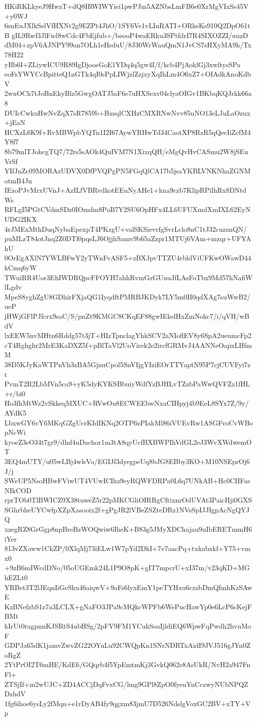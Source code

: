 HKiRKLkyeJ9HwzT+dQ8IRWIWYiei1pwPJm5AZNbsLmFB6e0XrMgVIxSs45V+y0WJ
6snEuJXlkSelVfHXNt2g9EZPt4JhO/1SY6Ve1vLIuRATI+ORkeKs910Q2DpO61tB
gIL9Rwf3JlFiel8wCdc4FbEjfub+/beooP4waERku3SPtfdrI7R4SIXOZZI/uuzD
dM04+zpV6AJNPY99an7OLh1eHsduU/8J30WrWauQmN1JvCS7sHXyMA9h/Tx78H22
yBb6I+ZLiywICU9R89IgDjoosGoE1YDq4q5gw4I/f/kcb4PjAoklGj3xwltysSPa
eoFsYWYCcBpitteQ1nGTk4qI0sPpLIWjzlZzjxyXqIhLm4O6xZ7+OIAdkAnoKdbV
2wuOCh7tJoBnEkyBlz5GwgOATJ5aF6e7uHXSexv04clyaOIGv1BKbqKQJrkk66a8
DUIcCwkuHwNvZqX7sR7859b+BxsqlCXHzCMXRNwNvv85uNO13eLJuLaOzux+jEaN
HCXzL6K9f+RvMBWpbYQTn1I2I67AywYRHwTd34CaotXP8RzR5qQecIiZcfM4Y8f7
8b79mlTJohcgTQ7/72rs5sAOk4QuIVM7N1XixqQH/eMgQvHvCASmu2W8jSEuVrSf
YIfJnZc09MORAzUDVX0DfPVQPgPN5FGqQlCA17b5jsaYKBLVNKNhaZGNMotmB4Jn
IEzoPJvMrxUVnJ+AzILfVBRvdkotEEuNyAHe1+kna9czb7KlipRPilhRx8DNtdWs
RFLgI5PGtCVdmSDz0IOmdm8PoB7Y2SU6OpHFx4LL6UFUXmdXmIXL62EyNUDG2IKX
4rJMExMthDuqNybaEpexpT4PKzgU+valSKSievrfgSvrLclo8nC1tJ32cuzznQN/
puMLzT84otJnq2Z0DTl0pqsLJ6OjjhSamv9b65aZzpr1MTUj6VAm+mzqr+UFYAhU
0OrEgAXlN7YWLBFwY2yTWnFvASF5+zBXJpvTTZU4rbldViUFKwOWawD44kCmq6yW
TWuiRR4Uor3EhIWDRQpcFFOYH7ahhRvmGzGUuuJfLAsFoTbx9Md57hNafiWlLgdv
MpeS8yghZgU8GDhirFXjaQG1IyqdftPMRBJKDyk7LY5m0II0qdXAg7suWwB2/ueP
jHWjGFlPJfcrx9saC/S/pnZt9KMGC8CKqEF88gwIElsdHxZmNokc7/i/qVH/wBdV
lxEEW5nvMHtn6Rddg57t3jT+HIzTpnclagYhkSCV2aNIoflEV8y6SpA2ueumcFp2
cT4Rghghr2MrE3KaDXZ5f+pBlTaVl2UoVirek2e2ircfGRMvJ4AANNeOapxLHfmM
38D5KJyKaWTPnVh3zBA5GjnuCpol5SnVIjgYIziEOrTTYaptN95P7cjCUVFyi7zt
PvmT2R2LbMVn5ca9+yK5dyKYKSBbuiyWdfYzBJHLvTZzbPaWwQVFZz1fHL+r/bi0
Ho3fhMtWz2vSkkeqMXUC+RVwOu8ECWEEbwNxaCIHpyj4b9EeL8SYx7Z/9y/AYdK5
LbxwGY6vY6MKqGZgUcrKIdIKNq2OTP6zPIakMl86iVUEvRw1ASGFvoCvWBopNcWi
kyoeZ3eO34t7gr9/dlnf4uDachor1m3tA8qyUcfBXBWPIhVdGL2eJ3WvXWdwemOT
3EQ4mUTY/u05wLBj4wlsVo/EGIJf3dyegpeUq8bJG8EBby3KO+M10NSEprOj6J/j
SWeUP5NsoHBwFViwUT4VUwICIhz9eyRQWFDRPa0L6q7UNkAB+Hc0CIIFasNIkCOD
rprTOb0TlBWICZ9X38tuweZ5r22pMKCGliOIRRgCftixnrOdUVAt3PaicHji0GXS
SGhrbheUYCwfpXZpXasooix2f+gPgJR2lVBeZSZteDRz1NVsSpIJJIgpAcNgQYJQ
xzegRZ8GrGgp8npBreBzWOQwiw6IheK+B83g5JMyXDChajau9uIbERETmmH6iYer
813vZXaww1CkZP/0XlqMj73iELw1W7pYd2DkI+7v7aacPq+txkabxkf+Y75+vmx0
+9zB6mIWcdDNo/05oUGEmk24L1P9O8pK+gIT7mpcrU+xI37m/v23qKD+MGhEZLt0
YRBet3T2lJEqnIiGeSku46aiqwV+9aFs6lyxEmY1peTYHxu6czzbDmQfmhKzSAwE
KzBNefzbS1z7a3LCLX+gNaFO3JPa9cMQkcWPFb6WePucHawYp0e6LcP6cKejFBMt
kIrUt0ragpnnKJSRtS4ubHSg/2pFV9FM1YCukSoaIjldiEQ6WpwFqPwdh2hvuMoF
GDPJa65dK1jamvZwvZG22OYuLu92CWQpKn1SNrNDRTxAidI9JVJ516gJYn0ZoRgZ
2YtPrOI2T6mHE/KdE6/GQqrb4f5YpEmtmKj3GvkQ062e8AsUkR/NvH2a947FnFl+
ZTSjIf+m2wUJC+ZD4ACCjDqFvxCG/lmg9GPl8ZpO0fyeuYnCczwyNUbNPQZDzhdV
1fg6ihoe6ysLy2fMqn+e1rDyAB4fy9qgxm83jmU7D526NdslgVoxGC2BV+xTY+Vp
